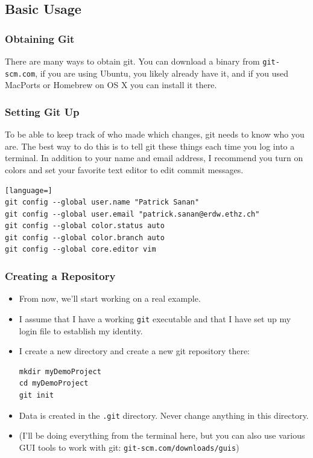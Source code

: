 \documentclass{beamer}
\begin{document}
\subsection{Basic Usage}
\begin{frame}[fragile]
\frametitle{Obtaining Git}
There are many ways to obtain git. 
You can download a binary from \texttt{git-scm.com}, if you are using Ubuntu, you likely already have it, and if you used MacPorts or Homebrew on OS X you can install it there.
\end{frame}

\begin{frame}[fragile]
\frametitle{Setting Git Up}
To be able to keep track of who made which changes, git needs to know who you are.
The best way to do this is to tell git these things each time you log into a terminal.
In addition to your name and email address, I recommend you turn on colors and set your favorite text editor to edit commit messages.
\begin{lstlisting}[language=]
git config --global user.name "Patrick Sanan"
git config --global user.email "patrick.sanan@erdw.ethz.ch"
git config --global color.status auto
git config --global color.branch auto 
git config --global core.editor vim
\end{lstlisting}
\end{frame}

\begin{frame}[fragile]
\frametitle{Creating a Repository}
\begin{itemize}
\item From now, we'll start working on a real example. 
\item I assume that I have a working \lstinline{git} executable and that I have set up my login file to establish my identity.
\item I create a new directory and create a new git repository there:
\begin{lstlisting}[language=C++]
mkdir myDemoProject
cd myDemoProject
git init
\end{lstlisting}
\item Data is created in the \lstinline{.git} directory. Never change anything in this directory.
\item (I'll be doing everything from the terminal here, but you can also use various GUI tools to work with git: \texttt{git-scm.com/downloads/guis})
\end{itemize}
\end{frame}
\end{document}
